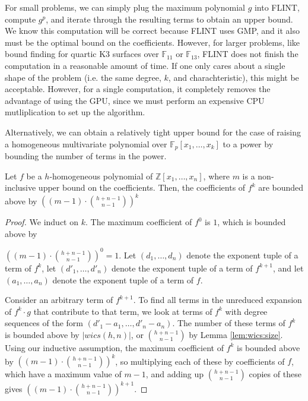 For small problems, we can simply plug the maximum 
polynomial $g$ into FLINT, compute $g ^ p$, and 
iterate through the resulting terms to obtain an upper bound.
We know this computation will be correct because FLINT uses GMP,
and it also must be the optimal bound on the coefficients. 
However, for larger problems, like bound finding for 
quartic K3 surfaces over $\mathbb{F}_{11}$ or $\mathbb{F}_{13}$, 
FLINT does not finish the computation in a reasonable amount of time.
If one only cares about a single shape of the problem 
(i.e. the same degree, \(k\), and charachteristic),
this might be acceptable.
However, for a single computation, it completely removes 
the advantage of using the GPU, since we must perform an 
expensive CPU mutliplication to set up the algorithm.

Alternatively, we can obtain a relatively tight upper 
bound for the case of raising a homogeneous multivariate 
polynomial over $\mathbb{F}_p[x_1, \dots , x_k]$ to a power
by bounding the number of terms in the power. 

\begin{thm}
    Let $f$ be a $h$-homogeneous polynomial of $\mathbb{Z}[x_1, \dots, x_n]$, where $m$ is a non-inclusive upper bound on the coefficients. Then, the coefficients of $f ^ k$ are bounded above by $\left((m - 1) \cdot \binom{h + n - 1}{n - 1}\right)^ k$
\end{thm}

\begin{proof}
    We induct on $k$. The maximum coefficient of $f^0$ is $1$, which is bounded above by 
    
    \noindent$\left((m - 1) \cdot \binom{h + n - 1}{n - 1}\right)^ 0 = 1$.
    Let $(d_1, \dots , d_n)$ denote the exponent tuple of a term of $f^k$, let $(d'_1, \dots , d'_n)$ denote the exponent tuple of a term of $f^{k + 1}$, and let $(a_1, \dots , a_n)$ denote the exponent tuple of a term of $f$.

    Consider an arbitrary term of $f^{k + 1}$. To find all terms in the unreduced expansion of $f^k \cdot g$ that contribute to that term, we look at terms of $f^k$ with degree sequences of the form $(d'_1 - a_1, \dots , d'_n - a_n)$. The number of these terms of $f^k$ is bounded above by $|wics(h, n)|$, or $\binom{h + n - 1}{n - 1}$ by Lemma \ref{lem:wics:size}. Using our inductive assumption, the maximum coefficient of $f^k$ is bounded above by $\left((m - 1) \cdot \binom{h + n - 1}{n - 1}\right)^ k$, so multiplying each of these by coefficients of $f$, which have a maximum value of $m - 1$, and adding up $\binom{h + n - 1}{n - 1}$ copies of these gives $\left((m - 1) \cdot \binom{h + n - 1}{n - 1}\right)^{k + 1}$.
\end{proof}

